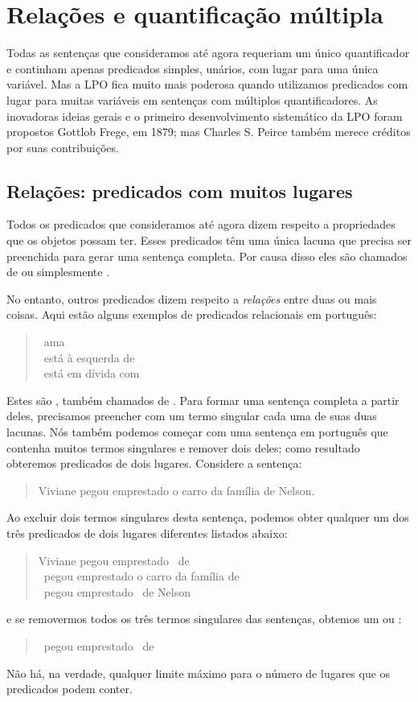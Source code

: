 \chapter{Relações e quantificação múltipla}\label{s:MultipleGenerality}
Todas as sentenças que consideramos até agora requeriam um único quantificador e continham apenas predicados simples, unários, com lugar para uma única variável. 
Mas a LPO fica muito mais poderosa quando utilizamos predicados com lugar para muitas variáveis em sentenças com múltiplos quantificadores.
As inovadoras ideias gerais e o primeiro desenvolvimento sistemático da LPO foram propostos \mbox{Gottlob} Frege, em 1879; mas Charles S. Peirce também merece créditos por suas contribuições.


\section{Relações: predicados com muitos lugares}
Todos os predicados que consideramos até agora dizem respeito a propriedades que os objetos possam ter.
Esses predicados têm uma única lacuna que precisa ser preenchida para gerar uma sentença completa.
Por causa disso eles são chamados de  ou simplesmente .

No entanto, outros predicados dizem respeito a \emph{relações} entre duas ou mais coisas.
Aqui estão alguns exemplos de predicados relacionais em português:
	\begin{quote}
		\blank\ ama \blank\\
		\blank\ está à esquerda de \blank\\
		\blank\ está em dívida com \blank
	\end{quote}
Estes são , também chamados de .
Para formar uma sentença completa a partir deles, precisamos preencher com um termo singular cada uma de suas duas lacunas.
Nós também podemos começar com uma sentença em português que contenha muitos termos singulares e remover dois deles; como resultado obteremos predicados de dois lugares.
Considere a sentença:
\begin{quote}
	Viviane pegou emprestado o carro da família de Nelson.
\end{quote}
Ao excluir dois termos singulares desta sentença, podemos obter qualquer um dos  três predicados de dois lugares diferentes listados abaixo:
	\begin{quote}
		Viviane pegou emprestado \blank\ de \blank\\
		\blank\ pegou emprestado o carro da família de \blank\\
		\blank\ pegou emprestado \blank\ de Nelson
	\end{quote}
e se removermos todos os três termos singulares das sentenças, obtemos um  ou :
	\begin{quote}
		\blank\ pegou emprestado \blank\ de \blank
	\end{quote}
Não há, na verdade, qualquer limite máximo para o número de lugares que os predicados podem conter.

